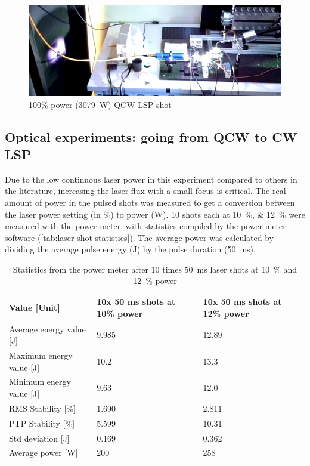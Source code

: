             \begin{figure}[!ht]
                \centering
                \includegraphics[width=\textwidth]{assets/4 experiments/holy jesus look at this.png}
                \caption{100\% power (\qty{3079}{W}) QCW LSP shot}
                \label{fig: big flash}
            \end{figure}

        \subsection{Optical experiments: going from QCW to CW LSP}

            Due to the low continuous laser power in this experiment compared to others in the literature, increasing the laser flux with a small focus is critical. The real amount of power in the pulsed shots was measured to get a conversion between the laser power setting (in \%) to power (W). 10 shots each at \qtylist{10; 12}{\%} were measured with the power meter, with statistics compiled by the power meter software (\autoref{tab:laser shot statistics}). The average power was calculated by dividing the average pulse energy (J) by the pulse duration (\qty{50}{ms}).

            \begin{table}[!ht]
                \caption{Statistics from the power meter after 10 times \qty{50}{ms} laser shots at \qty{10}{\%} and \qty{12}{\%} power}
                \label{tab:laser shot statistics}
                \begin{tabular}{lll}
                \textbf{Value {[}Unit{]}} & \textbf{10x 50 ms shots at 10\% power} & \textbf{10x 50 ms shots at 12\% power} \\ \hline
                Average energy value {[}J{]}  & 9.985 & 12.89 \\
                Maximum energy value {[}J{]}  & 10.2  & 13.3  \\
                Minimum energy value {[}J{]}  & 9.63  & 12.0  \\
                RMS Stability {[}\%{]} & 1.690 & 2.811 \\
                PTP Stability {[}\%{]} & 5.599 & 10.31 \\
                Std deviation {[}J{]}  & 0.169 & 0.362 \\
                Average power {[}W{]}  & 200 & 258  \\ \hline
                \end{tabular}
            \end{table}
            
